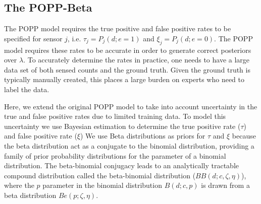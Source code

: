 
\subsection{The POPP-Beta}
\label{subsec:popb}

The POPP model requires the true positive and false positive rates to be specified for sensor $j$, i.e.  $\tau_j = P_j(d;e{=}1)$ and $\xi_j = P_j(d;e{=}0)$. 
The POPP model requires these rates to be accurate in order to generate correct posteriors over $\lambda$. To accurately determine the rates in practice, one needs to have a large data set of both sensed counts and the ground truth. Given the ground truth is typically manually created, this places a large burden on experts who need to label the data.   

Here, we extend the original POPP model to take into account uncertainty in the true and false positive rates due to limited training data.
% 
To model this uncertainty we use Bayesian estimation to determine the 
true positive rate ($\tau$) and false positive rate ($\xi$)
% 
We use Beta distributions as priors for $\tau$ and $\xi$ because the beta distribution act as a conjugate to the binomial distribution, providing a family of prior probability distributions for the parameter of a binomial distribution. The beta-binomial conjugacy leads to an analytically tractable compound distribution called the beta-binomial distribution ($BB(d ; c, \zeta, \eta)$), where the $p$ parameter in the binomial distribution $B(d ; c, p)$ is drawn from a beta distribution $Be(p ; \zeta, \eta)$.


